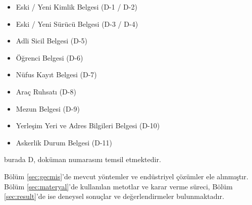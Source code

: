 \documentclass[conference, a4paper]{IEEEtran}
\begin{document}
\begin{itemize}
    \setlength{\itemsep}{0.5pt}
    \item\label{idendity}Eski / Yeni Kimlik Belgesi (D-1 / D-2)
    \item\label{driver_license} Eski / Yeni Sürücü Belgesi (D-3 / D-4)
    \item Adli Sicil Belgesi (D-5)
    \item Öğrenci Belgesi (D-6)
    \item Nüfus Kayıt Belgesi (D-7)
    \item Araç Ruhsatı (D-8)
    \item Mezun Belgesi (D-9)
    \item Yerleşim Yeri ve Adres Bilgileri Belgesi (D-10)
    \item Askerlik Durum Belgesi (D-11)
\end{itemize}
burada D, doküman numarasını temsil etmektedir.

Bölüm \ref{sec:gecmis}'de mevcut yöntemler ve endüstriyel çözümler ele alınmıştır. Bölüm \ref{sec:materyal}'de
kullanılan metotlar ve karar verme süreci, Bölüm \ref{sec:result}'de ise deneysel sonuçlar ve değerlendirmeler
bulunmaktadır.
\end{document}
